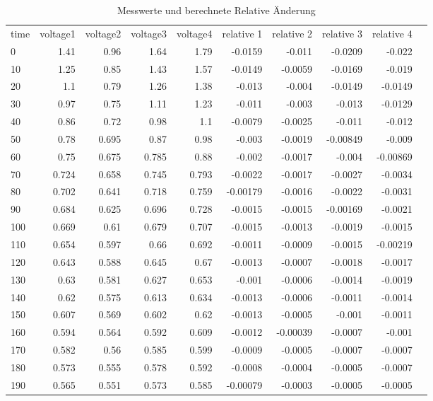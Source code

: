 \documentclass[11pt]{article}
\begin{document}
\newpage
\begin{table}[!htp]\centering
    \caption{Messwerte und berechnete Relative Änderung}\label{tab:messwerte}
    \scriptsize
    \begin{tabular}{l|r|r|r|r|r|r|r|r|r}\toprule
    time &voltage1 &voltage2 &voltage3 &voltage4 &relative 1 &relative 2 &relative 3 &relative 4 \\\cmidrule{1-9}
    0 &1.41 &0.96 &1.64 &1.79 &-0.0159 &-0.011 &-0.0209 &-0.022 \\
    10 &1.25 &0.85 &1.43 &1.57 &-0.0149 &-0.0059 &-0.0169 &-0.019 \\
    20 &1.1 &0.79 &1.26 &1.38 &-0.013 &-0.004 &-0.0149 &-0.0149 \\
    30 &0.97 &0.75 &1.11 &1.23 &-0.011 &-0.003 &-0.013 &-0.0129 \\
    40 &0.86 &0.72 &0.98 &1.1 &-0.0079 &-0.0025 &-0.011 &-0.012 \\
    50 &0.78 &0.695 &0.87 &0.98 &-0.003 &-0.0019 &-0.00849 &-0.009 \\
    60 &0.75 &0.675 &0.785 &0.88 &-0.002 &-0.0017 &-0.004 &-0.00869 \\
    70 &0.724 &0.658 &0.745 &0.793 &-0.0022 &-0.0017 &-0.0027 &-0.0034 \\
    80 &0.702 &0.641 &0.718 &0.759 &-0.00179 &-0.0016 &-0.0022 &-0.0031 \\
    90 &0.684 &0.625 &0.696 &0.728 &-0.0015 &-0.0015 &-0.00169 &-0.0021 \\
    100 &0.669 &0.61 &0.679 &0.707 &-0.0015 &-0.0013 &-0.0019 &-0.0015 \\
    110 &0.654 &0.597 &0.66 &0.692 &-0.0011 &-0.0009 &-0.0015 &-0.00219 \\
    120 &0.643 &0.588 &0.645 &0.67 &-0.0013 &-0.0007 &-0.0018 &-0.0017 \\
    130 &0.63 &0.581 &0.627 &0.653 &-0.001 &-0.0006 &-0.0014 &-0.0019 \\
    140 &0.62 &0.575 &0.613 &0.634 &-0.0013 &-0.0006 &-0.0011 &-0.0014 \\
    150 &0.607 &0.569 &0.602 &0.62 &-0.0013 &-0.0005 &-0.001 &-0.0011 \\
    160 &0.594 &0.564 &0.592 &0.609 &-0.0012 &-0.00039 &-0.0007 &-0.001 \\
    170 &0.582 &0.56 &0.585 &0.599 &-0.0009 &-0.0005 &-0.0007 &-0.0007 \\
    180 &0.573 &0.555 &0.578 &0.592 &-0.0008 &-0.0004 &-0.0005 &-0.0007 \\
    190 &0.565 &0.551 &0.573 &0.585 &-0.00079 &-0.0003 &-0.0005 &-0.0005 \\

\end{tabular}
\end{table}
\end{document}
